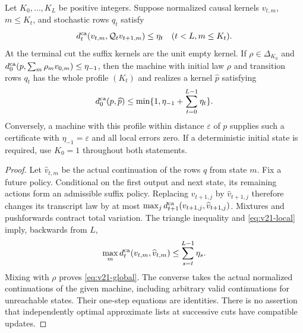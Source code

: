 \begin{theorem}\label{thm:v21-compatible}
Let $K_0,\ldots,K_L$ be positive integers. Suppose normalized causal
kernels $v_{t,m}$, $m\le K_t$, and stochastic rows $q_t$ satisfy
\begin{equation}\label{eq:v21-local}
 d_t^{\rm ca}(v_{t,m},\mathcal Q_t v_{t+1,m})\le\eta_t
 \quad(t<L,m\le K_t).
\end{equation}
At the terminal cut the suffix kernels are the unit empty kernel. If
$\rho\in\Delta_{K_0}$ and
$d_0^{\rm ca}(p,\sum_m\rho_m v_{0,m})\le\eta_{-1}$, then the
machine with initial law $\rho$ and transition rows $q_t$ has the whole
profile $(K_t)$ and realizes a kernel $\widehat p$ satisfying
\begin{equation}\label{eq:v21-global}
 d_0^{\rm ca}(p,\widehat p)\le
 \min\{1,\eta_{-1}+\sum_{t=0}^{L-1}\eta_t\}.
\end{equation}
Conversely, a machine with this profile within distance $\varepsilon$
of $p$ supplies such a certificate with $\eta_{-1}=\varepsilon$ and
all local errors zero. If a deterministic initial state is required,
use $K_0=1$ throughout both statements.
\end{theorem}
\begin{proof}
Let $\widehat v_{t,m}$ be the actual continuation of the rows $q$ from
state $m$. Fix a future policy. Conditional on the first output and next
state, its remaining actions form an admissible suffix policy. Replacing
$v_{t+1,j}$ by $\widehat v_{t+1,j}$ therefore changes its transcript law
by at most $\max_j d_{t+1}^{\rm ca}(v_{t+1,j},\widehat v_{t+1,j})$.
Mixtures and pushforwards contract total variation. The triangle
inequality and \eqref{eq:v21-local} imply, backwards from $L$,
\[
 \max_m d_t^{\rm ca}(v_{t,m},\widehat v_{t,m})
 \le\sum_{s=t}^{L-1}\eta_s.
\]
Mixing with $\rho$ proves \eqref{eq:v21-global}. The converse takes the
actual normalized continuations of the given machine, including arbitrary
valid continuations for unreachable states. Their one-step equations are
identities. There is no assertion that independently optimal approximate
lists at successive cuts have compatible updates.
\end{proof}

